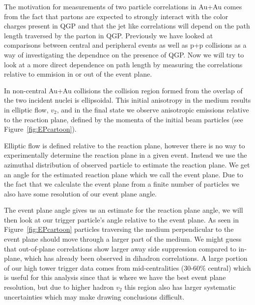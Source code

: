 The motivation for measurements of two particle correlations in Au+Au comes from the fact that partons are expected to strongly interact with the color charges present in QGP and that the jet like correlations will depend on the path length traversed by the parton in QGP. Previously we have looked at comparisons between central and peripheral events as well as p+p collisions as a way of investigating the dependnce on the presence of QGP. Now we will try to look at a more direct dependence on path length by measuring the correlations relative to emmision in or out of the event plane.

In non-central Au+Au collisions the collision region formed from the overlap of the two incident nuclei is ellipsoidal. This initial anisotropy in the medium results in elliptic flow, $v_2$, and in the final state we observe anisotropic emissions relative to the reaction plane, defined by the momenta of the initial beam particles (see Figure~\ref{fig:EPcartoon}). 

Elliptic flow is defined relative to the reaction plane, however there is no way to experimentally determine the reaction plane in a given event. Instead we use the azimuthal distribution of observed particle to estimate the reaction plane. We get an angle for the estimated reaction plane which we call the event plane. Due to the fact that we calculate the event plane from a finite number of particles we also have some resolution of our event plane angle.

The event plane angle gives us an estimate for the reaction plane angle, we will then look at our trigger particle's angle relative to the event plane. As seen in Figure~\ref{fig:EPcartoon} particles traversing the medium perpendicular to the event plane should move through a larger part of the medium. We might guess that out-of-plane correlations show larger away side suppression compared to in-plane, which has already been observed in dihadron correlations. A large portion of our high tower trigger data comes from mid-centralities (30-60\% central) which is useful for this analysis since that is where we have the best event plane resolution, but due to higher hadron $v_2$ this region also has larger systematic uncertainties which may make drawing conclusions difficult.

